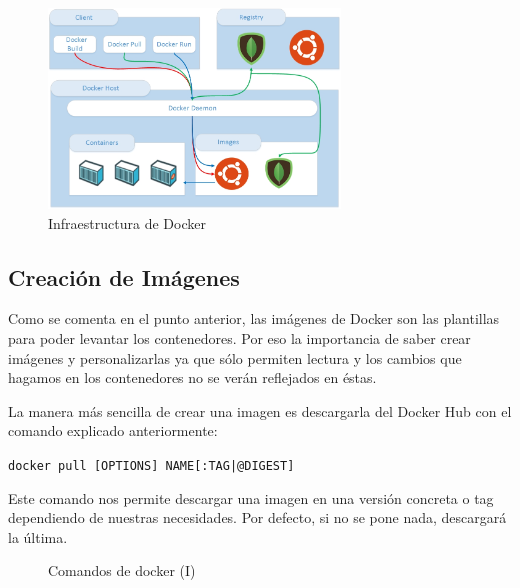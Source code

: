 \begin{figure}[htb]
\begin{center}
\includegraphics[width=0.69\textwidth]{./setup/Infraestructura}
\caption{Infraestructura de Docker}
\label{Inf:Infraestructura}
\end{center}
\end{figure}

\subsection{Creación de Imágenes}

Como se comenta en el punto anterior, las imágenes de Docker son las plantillas para
poder levantar los contenedores. Por eso la importancia de saber crear imágenes y personalizarlas ya que sólo permiten lectura y los cambios que hagamos en los contenedores no se verán reflejados en éstas.

La manera más sencilla de crear una imagen es descargarla del Docker Hub con el comando explicado anteriormente:

\begin{center}
\texttt{docker pull [OPTIONS] NAME[:TAG|@DIGEST]}
\end{center}

Este comando nos permite descargar una imagen en una versión concreta o tag dependiendo de nuestras necesidades. Por defecto, si no se pone nada, descargará la última. 

\begin{figure}[htb]
\begin{center}
\caption{Comandos de docker (I)}
\label{Com1:ComandosDocker1}
\end{center}
\end{figure}

